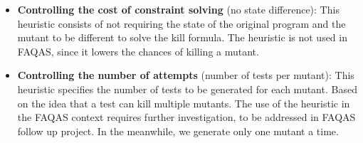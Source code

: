 \begin{itemize}
	\item \textbf{Controlling the cost of constraint solving} (no state difference): This heuristic consists of not requiring the state of the original program and the mutant to be different to solve the kill formula. The heuristic is not used in FAQAS, since it lowers the chances of killing a mutant. 

	\item \textbf{Controlling the number of attempts} (number of tests per mutant): This heuristic specifies the number of tests to be generated for each mutant. Based on the idea that a test can kill multiple mutants. The use of the heuristic in the FAQAS context requires further investigation, to be addressed in FAQAS follow up project. In the meanwhile, we generate only one mutant a time.

\end{itemize}

\ENDCHANGEDWPT

